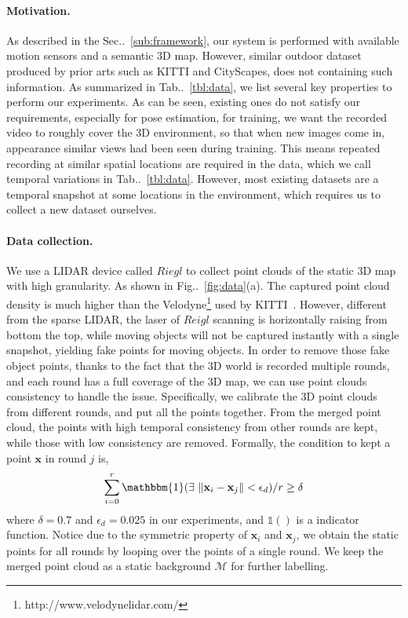 \documentclass[10pt,twocolumn,letterpaper]{article}
\makeatletter
\newcommand{\figref}[1]{Fig\onedot~\ref{#1}}
\newcommand{\secref}[1]{Sec\onedot~\ref{#1}}
\newcommand{\tabref}[1]{Tab\onedot~\ref{#1}}
\newcommand{\ve}[1]{{\mathbf #1}} %
\newcommand{\hua}[1]{{\mathcal #1}}
\DeclareRobustCommand\onedot{\futurelet\@let@token\@onedot}
\def\onedot{\ifx\@let@token.\else.\null\fi\xspace}
\makeatother
\begin{document}
\paragraph{Motivation.}
As described in the \secref{sub:framework}, our system is performed with available motion sensors and a semantic 3D map. 
However, similar outdoor dataset produced by prior arts such as KITTI and CityScapes, does not containing such information. As summarized in \tabref{tbl:data}, we list several key properties to perform our experiments. 
As can be seen, existing ones do not satisfy our requirements, especially for pose estimation, for training, we want the recorded video to roughly cover the 3D environment, so that when new images come in, appearance similar views had been seen during training. This means repeated recording at similar spatial locations are required in the data, which we call temporal variations in \tabref{tbl:data}.
However, most existing datasets are a temporal snapshot at some locations in the environment, which requires us to collect a new dataset ourselves.

\paragraph{Data collection.}
We use a LIDAR device called $Riegl$ to collect point clouds of the static 3D map with high granularity. As shown in \figref{fig:data}(a). The captured point cloud density is much higher than the Velodyne\footnote{http://www.velodynelidar.com/} used by KITTI~\cite{geiger2012we}. 
However, different from the sparse LIDAR, the laser of $Reigl$ scanning is horizontally raising from bottom the top, while moving objects will not be captured instantly with a single snapshot, yielding fake points for moving objects. 
In order to remove those fake object points, thanks to the fact that the 3D world is recorded multiple rounds, and each round has a full coverage of the 3D map, we can use point clouds consistency to handle the issue.
Specifically, we calibrate the 3D point clouds from different rounds, and put all the points together. From the merged point cloud, the points with high temporal consistency from other rounds are kept, while those with low consistency are removed. Formally, the condition to kept a point $\ve{x}$ in round $j$ is,
\begin{align}
\sum_{i=0}^{r}{\mathbbm{1}(\exists~\|\ve{x}_i - \ve{x}_j\| < \epsilon_d )} / r \geq \delta
\end{align}
where $\delta = 0.7$ and $\epsilon_d = 0.025$ in our experiments, and $\mathbb{1}()$ is a indicator function. Notice due to the symmetric property of $\ve{x}_i$ and $\ve{x}_j$, we obtain the static points for all rounds by looping over the points of a single round. We keep the merged point cloud as a static background $\hua{M}$ for further labelling.
\end{document}
